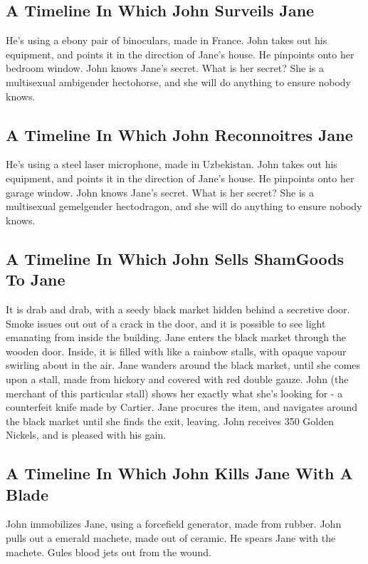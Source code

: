 \documentclass{article}
\begin{document}
\subsection{A Timeline In Which John Surveils Jane}


He's using a ebony pair of binoculars, made in France.
John takes out his equipment, and points it in the direction of Jane's house. He pinpoints onto her bedroom window.
John knows Jane's secret. What is her secret? She is a multisexual ambigender hectohorse, and she will do anything to ensure nobody knows.
\subsection{A Timeline In Which John Reconnoitres Jane}


He's using a steel laser microphone, made in Uzbekistan.
John takes out his equipment, and points it in the direction of Jane's house. He pinpoints onto her garage window.
John knows Jane's secret. What is her secret? She is a multisexual gemelgender hectodragon, and she will do anything to ensure nobody knows.
\subsection{A Timeline In Which John Sells ShamGoods To Jane}


It is drab and drab, with a seedy black market hidden behind a secretive door.
Smoke issues out out of a crack in the door, and it is possible to see light emanating from inside the building.
Jane enters the black market through the wooden door.
Inside, it is filled with like a rainbow stalls, with opaque vapour swirling about in the air.
Jane wanders around the black market, until she comes upon a stall, made from hickory and covered with red double gauze.
John (the merchant of this particular stall) shows her exactly what she's looking for {-} a counterfeit knife made by Cartier.
Jane procures the item, and navigates around the black market until she finds the exit, leaving.
John receives 350 Golden Nickels, and is pleased with his gain.
\subsection{A Timeline In Which John Kills Jane With A Blade}


John immobilizes Jane, using a forcefield generator, made from rubber.
John pulls out a emerald machete, made out of ceramic.
He spears Jane with the machete.
Gules blood jets out from the wound.
\end{document}
